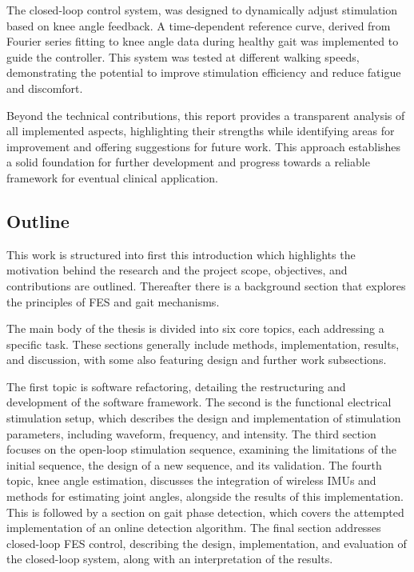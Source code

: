 The closed-loop control system, was designed to dynamically adjust stimulation based on knee angle feedback. A time-dependent reference curve, derived from Fourier series fitting to knee angle data during healthy gait was implemented to guide the controller. This system was tested at different walking speeds, demonstrating the potential to improve stimulation efficiency and reduce fatigue and discomfort.

Beyond the technical contributions, this report provides a transparent analysis of all implemented aspects, highlighting their strengths while identifying areas for improvement and offering suggestions for future work. This approach establishes a solid foundation for further development and progress towards a reliable framework for eventual clinical application.


\subsection{Outline}
This work is structured into first this introduction which highlights the motivation behind the research and the project scope, objectives, and contributions are outlined. Thereafter there is a background section that explores the principles of FES and gait mechanisms.

The main body of the thesis is divided into six core topics, each addressing a specific task. These sections generally include methods, implementation, results, and discussion, with some also featuring design and further work subsections.

The first topic is software refactoring, detailing the restructuring and development of the software framework. The second is the functional electrical stimulation setup, which describes the design and implementation of stimulation parameters, including waveform, frequency, and intensity. The third section focuses on the open-loop stimulation sequence, examining the limitations of the initial sequence, the design of a new sequence, and its validation. The fourth topic, knee angle estimation, discusses the integration of wireless IMUs and methods for estimating joint angles, alongside the results of this implementation. This is followed by a section on gait phase detection, which covers the attempted implementation of an online detection algorithm. The final section addresses closed-loop FES control, describing the design, implementation, and evaluation of the closed-loop system, along with an interpretation of the results.










